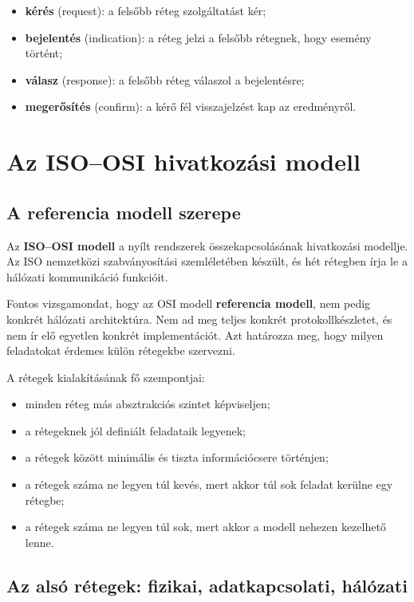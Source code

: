 \begin{itemize}
  \item \textbf{kérés} (request): a felsőbb réteg szolgáltatást kér;
  \item \textbf{bejelentés} (indication): a réteg jelzi a felsőbb rétegnek, hogy esemény történt;
  \item \textbf{válasz} (response): a felsőbb réteg válaszol a bejelentésre;
  \item \textbf{megerősítés} (confirm): a kérő fél visszajelzést kap az eredményről.
\end{itemize}

\section{Az ISO--OSI hivatkozási modell}

\subsection{A referencia modell szerepe}

Az \textbf{ISO--OSI modell} a nyílt rendszerek összekapcsolásának hivatkozási modellje. Az ISO nemzetközi szabványosítási szemléletében készült, és hét rétegben írja le a hálózati kommunikáció funkcióit.

Fontos vizsgamondat, hogy az OSI modell \textbf{referencia modell}, nem pedig konkrét hálózati architektúra. Nem ad meg teljes konkrét protokollkészletet, és nem ír elő egyetlen konkrét implementációt. Azt határozza meg, hogy milyen feladatokat érdemes külön rétegekbe szervezni.

A rétegek kialakításának fő szempontjai:

\begin{itemize}
  \item minden réteg más absztrakciós szintet képviseljen;
  \item a rétegeknek jól definiált feladataik legyenek;
  \item a rétegek között minimális és tiszta információcsere történjen;
  \item a rétegek száma ne legyen túl kevés, mert akkor túl sok feladat kerülne egy rétegbe;
  \item a rétegek száma ne legyen túl sok, mert akkor a modell nehezen kezelhető lenne.
\end{itemize}



\subsection{Az alsó rétegek: fizikai, adatkapcsolati, hálózati}

